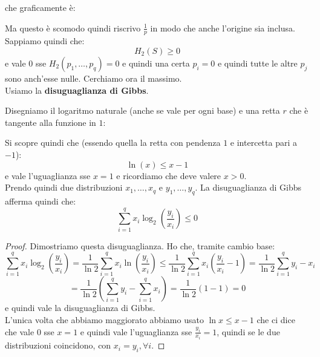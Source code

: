 \documentclass[a4paper,12pt, oneside]{book}
\begin{document}
che graficamente è:
\begin{figure}[H]
  \centering
\end{figure}
Ma questo è scomodo quindi riscrivo $\frac{1}{p}$ in modo che anche l'origine
sia inclusa. \\
Sappiamo quindi che:
\[H_2(S)\geq 0\]
e vale 0 sse $H_2(p_1,\ldots, p_q)=0$ e quindi una certa $p_i=0$ e quindi tutte
le altre $p_j$ sono anch'esse nulle.
Cerchiamo ora il massimo.\\
Usiamo la \textbf{disuguaglianza di Gibbs}.
\begin{teorema}
  Disegniamo il logaritmo naturale (anche se vale per ogni base) e
  una retta $r$ che è tangente alla funzione in $1$:
  \begin{figure}[H]
    \centering
  \end{figure}
  Si scopre quindi che (essendo quella la retta con pendenza $1$ e
  intercetta pari a $-1$):
  \[\ln (x)\leq x-1\]
  e vale l'uguaglianza sse $x=1$ e ricordiamo che deve valere $x>0$.\\
  Prendo quindi due distribuzioni $x_1,\ldots, x_q$ e $y_1,\ldots, y_q$. La
  disuguaglianza di Gibbs afferma quindi che:
  \[\sum_{i=1}^q x_i\log_2\left(\frac{y_i}{x_i}\right)\leq 0\]
\end{teorema}
\begin{proof}
  Dimostriamo questa disuguaglianza. Ho che, tramite cambio base:
  \[\sum_{i=1}^q
    x_i\log_2\left(\frac{y_i}{x_i}\right)=\frac{1}{\ln 2}\sum_{i=1}^q
    x_i\ln\left(\frac{y_i}{x_i}\right)\leq \frac{1}{\ln 2}\sum_{i=1}^q
    x_i\left(\frac{y_i}{x_i}-1\right)=\frac{1}{\ln 2}\sum_{i=1}^q y_i-x_i\]
  \[=\frac{1}{\ln 2}\left(\sum_{i=1}^q y_i-\sum_{i=1}^q x_i\right)=\frac{1}{\ln
      2}(1-1)=0\]
  e quindi vale la disuguaglianza di Gibbs.\\
  L'unica volta che abbiamo maggiorato abbiamo usato $\ln x\leq x-1$ che ci
  dice che vale $0$ sse  $x=1$ e quindi vale l'uguaglianza sse
  $\frac{y_i}{x_i}=1$, quindi se le due distribuzioni coincidono, con
  $x_i=y_i,\forall i$.
\end{proof}
\end{document}
